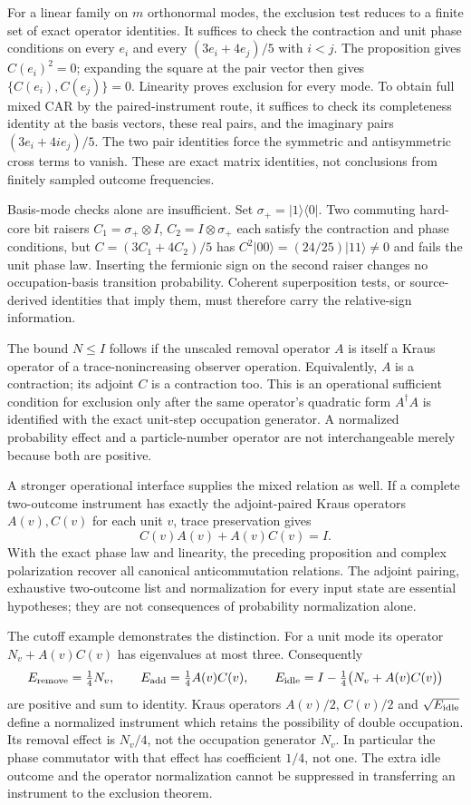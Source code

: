 For a linear family on $m$ orthonormal modes, the exclusion test reduces
to a finite set of exact operator identities. It suffices to check the
contraction and unit phase conditions on every $e_i$ and every
$(3e_i+4e_j)/5$ with $i<j$. The proposition gives $C(e_i)^2=0$;
expanding the square at the pair vector then gives
$\{C(e_i),C(e_j)\}=0$. Linearity proves exclusion for every mode.
To obtain full mixed CAR by the paired-instrument route, it suffices to
check its completeness identity at the basis vectors, these real pairs,
and the imaginary pairs $(3e_i+4i e_j)/5$. The two pair identities force
the symmetric and antisymmetric cross terms to vanish. These are exact
matrix identities, not conclusions from finitely sampled outcome
frequencies.

Basis-mode checks alone are insufficient. Set $\sigma_+=|1\rangle\langle0|$.
Two commuting hard-core bit raisers
$C_1=\sigma_+\otimes I$, $C_2=I\otimes\sigma_+$ each satisfy
the contraction and phase conditions, but
$C=(3C_1+4C_2)/5$ has
$C^2|00\rangle=(24/25)|11\rangle\ne0$ and fails the unit phase law.
Inserting the fermionic sign on the second raiser changes no
occupation-basis transition probability. Coherent superposition tests,
or source-derived identities that imply them, must therefore carry the
relative-sign information.

The bound $N\leq I$ follows if the unscaled removal operator $A$ is
itself a Kraus operator of a trace-nonincreasing observer operation.
Equivalently, $A$ is a contraction; its adjoint $C$ is a contraction too.
This is an operational sufficient condition for exclusion only after the
same operator's quadratic form $A^\dagger A$ is identified with the
exact unit-step occupation generator. A normalized probability effect
and a particle-number operator are not interchangeable merely because
both are positive.

A stronger operational interface supplies the mixed relation as well.
If a complete two-outcome instrument has exactly the adjoint-paired Kraus
operators $A(v),C(v)$ for each unit $v$, trace preservation gives
\[
 C(v)A(v)+A(v)C(v)=I.
\]
With the exact phase law and linearity, the preceding proposition and
complex polarization recover all canonical anticommutation relations.
The adjoint pairing, exhaustive two-outcome list and normalization for
every input state are essential hypotheses; they are not consequences
of probability normalization alone.

The cutoff example demonstrates the distinction. For a unit mode its
operator $N_v+A(v)C(v)$ has eigenvalues at most three. Consequently
\[
 E_{\rm remove}=\tfrac14N_v,\qquad
 E_{\rm add}=\tfrac14A(v)C(v),\qquad
 E_{\rm idle}=I-\tfrac14\bigl(N_v+A(v)C(v)\bigr)
\]
are positive and sum to identity. Kraus operators $A(v)/2$, $C(v)/2$
and $\sqrt{E_{\rm idle}}$ define a normalized instrument which retains
the possibility of double occupation. Its removal effect is $N_v/4$,
not the occupation generator $N_v$. In particular the phase commutator
with that effect has coefficient $1/4$, not one. The extra idle outcome
and the operator normalization cannot be suppressed in transferring an
instrument to the exclusion theorem.

